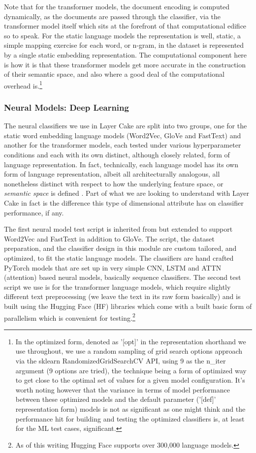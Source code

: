 \documentclass[final]{clv2025-revised}
\begin{document}
Note that for the transformer models, the document encoding is computed dynamically, as the documents are passed through the classifier, via the transformer model itself which sits at the forefront of that computational edifice so to speak. For the static language models the representation is well, static, a simple mapping exercise for each word, or n-gram, in the dataset is represented by a single static embedding representation. The computational component here is how it is that these transformer models get more accurate in the construction of their semantic space, and also where a good deal of the computational overhead is.\footnote{In the optimized form, denoted as '[opt]' in the representation shorthand we use throughout, we use a random sampling of grid search options approach via the sklearn RandomizedGridSearchCV API, using 9 as the n\_iter argument (9 options are tried), the technique being a form of optimized way to get close to the optimal set of values for a given model configuration. It's worth noting however that the variance in terms of model performance between these optimized models and the default parameter ('[def]' representation form) models is not as significant as one might think and the performance hit for building and testing the optimized classifiers is, at least for the ML test cases, significant.} 


\subsubsection{Neural Models: Deep Learning}

The neural classifiers we use in Layer Cake are split into two groups, one for the static word embedding language models (Word2Vec, GloVe and FastText) and another for the transformer models, each tested under various hyperparameter conditions and each with its own distinct, although closely related, form of language representation. In fact, technically, each language model has its own form of language representation, albeit all architecturally analogous, all nonetheless distinct with respect to how the underlying feature space, or \textit{semantic space} is defined \cite{worth}. Part of what we are looking to understand with Layer Cake in fact is the difference this type of dimensional attribute has on classifier performance, if any.

The first neural model test script is inherited from \cite{moreo2021} but extended to support Word2Vec and FastText in addition to GloVe. The script, the dataset preparation, and the classifier design in this module are custom tailored, and optimized, to fit the static language models. The classifiers are hand crafted PyTorch models that are set up in very simple CNN, LSTM and ATTN (attention) based neural models, basically sequence classifiers. The second test script we use is for the transformer language models, which require slightly different text preprocessing (we leave the text in its raw form basically) and is built using the Hugging Face (HF) libraries which come with a built basic form of parallelism which is convenient for testing.\footnote{As of this writing Hugging Face supports over 300,000 language models.}  
\end{document}
